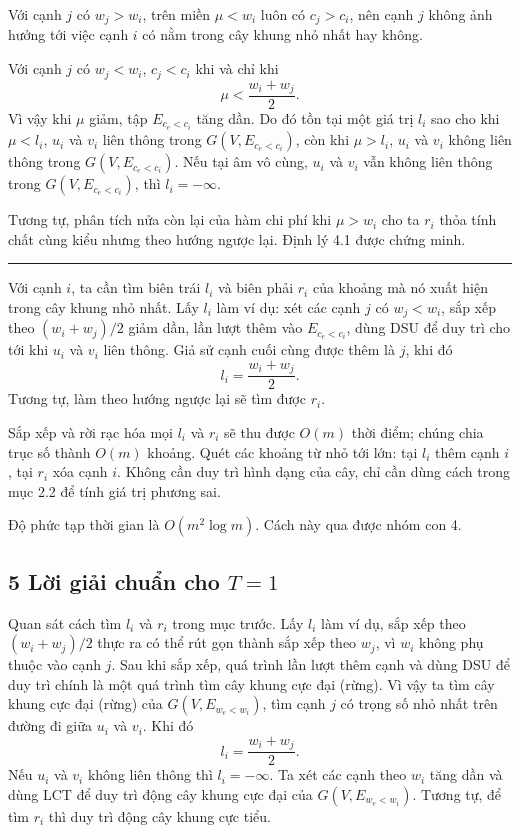 \documentclass[11pt]{article}
\newcommand{\qedmark}{\hfill\rule{0.7ex}{0.7ex}}
\begin{document}
Với cạnh \(j\) có \(w_j>w_i\), trên miền \(\mu<w_i\) luôn có \(c_j>c_i\), nên
cạnh \(j\) không ảnh hưởng tới việc cạnh \(i\) có nằm trong cây khung nhỏ nhất
hay không.

Với cạnh \(j\) có \(w_j<w_i\), \(c_j<c_i\) khi và chỉ khi
\[
  \mu<\frac{w_i+w_j}{2}.
\]
Vì vậy khi \(\mu\) giảm, tập \(E_{c_e<c_i}\) tăng dần. Do đó tồn tại một giá
trị \(l_i\) sao cho khi \(\mu<l_i\), \(u_i\) và \(v_i\) liên thông trong
\(G(V,E_{c_e<c_i})\), còn khi \(\mu>l_i\), \(u_i\) và \(v_i\) không liên thông
trong \(G(V,E_{c_e<c_i})\). Nếu tại âm vô cùng, \(u_i\) và \(v_i\) vẫn không
liên thông trong \(G(V,E_{c_e<c_i})\), thì \(l_i=-\infty\).

Tương tự, phân tích nửa còn lại của hàm chi phí khi \(\mu>w_i\) cho ta \(r_i\)
thỏa tính chất cùng kiểu nhưng theo hướng ngược lại. Định lý 4.1 được chứng
minh. \qedmark

Với cạnh \(i\), ta cần tìm biên trái \(l_i\) và biên phải \(r_i\) của khoảng mà
nó xuất hiện trong cây khung nhỏ nhất. Lấy \(l_i\) làm ví dụ: xét các cạnh \(j\)
có \(w_j<w_i\), sắp xếp theo \((w_i+w_j)/2\) giảm dần, lần lượt thêm vào
\(E_{c_e<c_i}\), dùng DSU để duy trì cho tới khi \(u_i\) và \(v_i\) liên thông.
Giả sử cạnh cuối cùng được thêm là \(j\), khi đó
\[
  l_i=\frac{w_i+w_j}{2}.
\]
Tương tự, làm theo hướng ngược lại sẽ tìm được \(r_i\).

Sắp xếp và rời rạc hóa mọi \(l_i\) và \(r_i\) sẽ thu được \(O(m)\) thời điểm;
chúng chia trục số thành \(O(m)\) khoảng. Quét các khoảng từ nhỏ tới lớn: tại
\(l_i\) thêm cạnh \(i\), tại \(r_i\) xóa cạnh \(i\). Không cần duy trì hình dạng
của cây, chỉ cần dùng cách trong mục 2.2 để tính giá trị phương sai.

Độ phức tạp thời gian là \(O(m^2\log m)\). Cách này qua được nhóm con 4.

\subsection*{\texorpdfstring{5 Lời giải chuẩn cho \(T=1\)}{5 Lời giải chuẩn cho T=1}}

Quan sát cách tìm \(l_i\) và \(r_i\) trong mục trước. Lấy \(l_i\) làm ví dụ,
sắp xếp theo \((w_i+w_j)/2\) thực ra có thể rút gọn thành sắp xếp theo \(w_j\),
vì \(w_i\) không phụ thuộc vào cạnh \(j\). Sau khi sắp xếp, quá trình lần lượt
thêm cạnh và dùng DSU để duy trì chính là một quá trình tìm cây khung cực đại
(rừng). Vì vậy ta tìm cây khung cực đại (rừng) của \(G(V,E_{w_e<w_i})\), tìm
cạnh \(j\) có trọng số nhỏ nhất trên đường đi giữa \(u_i\) và \(v_i\). Khi đó
\[
  l_i=\frac{w_i+w_j}{2}.
\]
Nếu \(u_i\) và \(v_i\) không liên thông thì \(l_i=-\infty\). Ta xét các cạnh
theo \(w_i\) tăng dần và dùng LCT để duy trì động cây khung cực đại của
\(G(V,E_{w_e<w_i})\). Tương tự, để tìm \(r_i\) thì duy trì động cây khung cực
tiểu.
\end{document}
